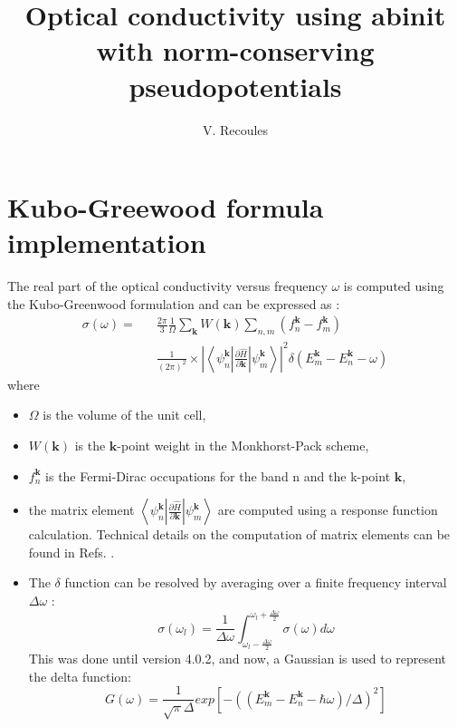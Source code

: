\documentclass[a4,12pts]{article}
\begin{document}
\title{Optical conductivity using abinit with norm-conserving pseudopotentials}
\author{V. Recoules}

\maketitle

\section{Kubo-Greewood formula implementation}
The real part of the optical conductivity versus frequency $\omega$ is
computed using the
Kubo-Greenwood formulation \cite{KUBO57, GREE58} and can be expressed as :
%
\begin {eqnarray}
\sigma(\omega) =&&{\frac {2\pi} {3 }}{\frac 1 \Omega}\sum_{\bm k} W({\bm k})
 \sum_{n,m}(f_n^{\bm{k}}-f_m^{\bm{k}}) \nonumber \\
&&{\frac 1 {(2 \pi)^2}}\times \left | \left < \psi_n^{\bm{k}} \left |
\frac{\partial \hat{H}}{\partial \bm{k}} \right|\psi_m^{\bm{k}}\right >
  \right|^2 \delta(E_m^{\bm{k}}-E_n^{\bm{k}}- \omega)
 \label{KUGR}
\end {eqnarray}
%
where
\begin{itemize}
\item $\Omega$ is the volume of the unit cell,
\item $W(\bm{k})$ is the $\bm{k}$-point weight in the Monkhorst-Pack scheme,
\item $f_n^{\bm{k}}$ is the Fermi-Dirac occupations for the band n and the k-point $\bm{k}$,
\item the matrix element $\left < \psi_n^{\bm{k}} \left |
\frac{\partial \hat{H}}{\partial \bm{k}} \right|\psi_m^{\bm{k}}\right >$
 are  computed using a response function calculation.
Technical details on the computation of matrix
elements can be found in Refs.  \cite{GONZ97, GONZL97}.
\item The $\delta$ function can be resolved by averaging over a finite frequency interval
$\Delta \omega$ \cite{PFAF97}:
%
\begin{equation}
 \sigma(\omega_l) = \frac{1}{\Delta \omega} \int_{\omega_l-\frac{\Delta \omega}{2}}
  ^{\omega_l+\frac{\Delta \omega}{2}} \sigma(\omega) d\omega
 \label{AVER}
\end{equation}
This was done until version 4.0.2, and now, a Gaussian is used to represent the delta function:
%
\begin{equation}
G(\omega)=\frac{1}{\sqrt{\pi}\Delta}exp\left[ -((E_m^{\bm{k}}-E_n^{\bm{k}}-\hbar \omega)/\Delta)^2
\right]
\end{equation}
%
\end{itemize}
%
\end{document}
